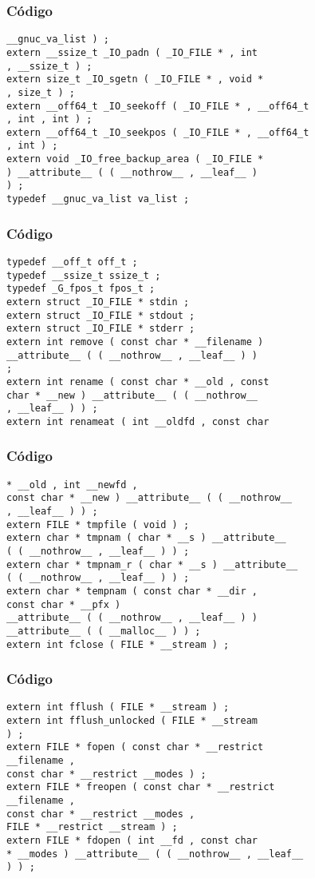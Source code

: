 \documentclass{beamer}
\begin{document}
\begin{frame}[fragile]
\frametitle{C\'odigo}
\begin{verbatim}
__gnuc_va_list ) ; 
extern __ssize_t _IO_padn ( _IO_FILE * , int 
, __ssize_t ) ; 
extern size_t _IO_sgetn ( _IO_FILE * , void * 
, size_t ) ; 
extern __off64_t _IO_seekoff ( _IO_FILE * , __off64_t 
, int , int ) ; 
extern __off64_t _IO_seekpos ( _IO_FILE * , __off64_t 
, int ) ; 
extern void _IO_free_backup_area ( _IO_FILE * 
) __attribute__ ( ( __nothrow__ , __leaf__ ) 
) ; 
typedef __gnuc_va_list va_list ; 
\end{verbatim}
\end{frame}
\begin{frame}[fragile]
\frametitle{C\'odigo}
\begin{verbatim}
typedef __off_t off_t ; 
typedef __ssize_t ssize_t ; 
typedef _G_fpos_t fpos_t ; 
extern struct _IO_FILE * stdin ; 
extern struct _IO_FILE * stdout ; 
extern struct _IO_FILE * stderr ; 
extern int remove ( const char * __filename ) 
__attribute__ ( ( __nothrow__ , __leaf__ ) ) 
; 
extern int rename ( const char * __old , const 
char * __new ) __attribute__ ( ( __nothrow__ 
, __leaf__ ) ) ; 
extern int renameat ( int __oldfd , const char 
\end{verbatim}
\end{frame}
\begin{frame}[fragile]
\frametitle{C\'odigo}
\begin{verbatim}
* __old , int __newfd , 
const char * __new ) __attribute__ ( ( __nothrow__ 
, __leaf__ ) ) ; 
extern FILE * tmpfile ( void ) ; 
extern char * tmpnam ( char * __s ) __attribute__ 
( ( __nothrow__ , __leaf__ ) ) ; 
extern char * tmpnam_r ( char * __s ) __attribute__ 
( ( __nothrow__ , __leaf__ ) ) ; 
extern char * tempnam ( const char * __dir , 
const char * __pfx ) 
__attribute__ ( ( __nothrow__ , __leaf__ ) ) 
__attribute__ ( ( __malloc__ ) ) ; 
extern int fclose ( FILE * __stream ) ; 
\end{verbatim}
\end{frame}
\begin{frame}[fragile]
\frametitle{C\'odigo}
\begin{verbatim}
extern int fflush ( FILE * __stream ) ; 
extern int fflush_unlocked ( FILE * __stream 
) ; 
extern FILE * fopen ( const char * __restrict 
__filename , 
const char * __restrict __modes ) ; 
extern FILE * freopen ( const char * __restrict 
__filename , 
const char * __restrict __modes , 
FILE * __restrict __stream ) ; 
extern FILE * fdopen ( int __fd , const char 
* __modes ) __attribute__ ( ( __nothrow__ , __leaf__ 
) ) ; 
\end{verbatim}
\end{frame}
\end{document}

